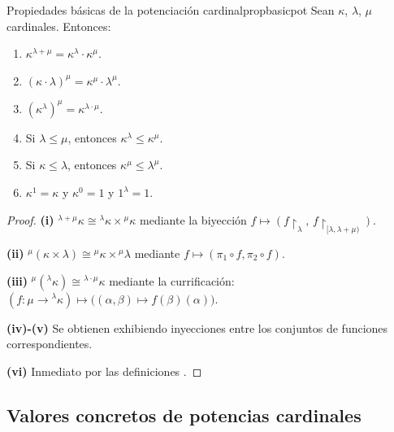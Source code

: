 \begin{proposicion}{Propiedades básicas de la potenciación cardinal}{propbasicpot}
Sean $\kappa$, $\lambda$, $\mu$ cardinales. Entonces:
\begin{enumerate}[leftmargin=2em, label=(\roman*)]
  \item $\kappa^{\lambda + \mu} = \kappa^\lambda \cdot \kappa^\mu$.
  \item $(\kappa \cdot \lambda)^\mu = \kappa^\mu \cdot \lambda^\mu$.
  \item $(\kappa^\lambda)^\mu = \kappa^{\lambda \cdot \mu}$.
  \item Si $\lambda \leq \mu$, entonces $\kappa^\lambda \leq \kappa^\mu$.
  \item Si $\kappa \leq \lambda$, entonces $\kappa^\mu \leq \lambda^\mu$.
  \item $\kappa^1 = \kappa$ y $\kappa^0 = 1$ y $1^\lambda = 1$.
\end{enumerate}
\end{proposicion}

\begin{proof}
\textbf{(i)} ${}^{\lambda+\mu}\kappa \cong {}^\lambda\kappa \times {}^\mu\kappa$ mediante la biyección $f \mapsto (f\!\restriction_\lambda, \, f\!\restriction_{[\lambda,\lambda+\mu)})$.

\textbf{(ii)} ${}^\mu(\kappa \times \lambda) \cong {}^\mu\kappa \times {}^\mu\lambda$ mediante $f \mapsto (\pi_1 \circ f, \pi_2 \circ f)$.

\textbf{(iii)} ${}^\mu({}^\lambda\kappa) \cong {}^{\lambda \cdot \mu}\kappa$ mediante la currificación: $(f \colon \mu \to {}^\lambda\kappa) \mapsto \bigl((\alpha, \beta) \mapsto f(\beta)(\alpha)\bigr)$.

\textbf{(iv)-(v)} Se obtienen exhibiendo inyecciones entre los conjuntos de funciones correspondientes.

\textbf{(vi)} Inmediato por las definiciones \cite{enderton1977, hrbacek1999}.
\end{proof}

\subsection{Valores concretos de potencias cardinales}

